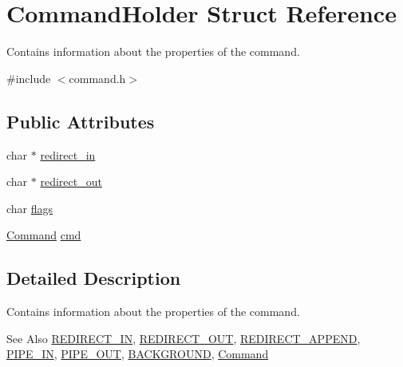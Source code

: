 \hypertarget{structCommandHolder}{\section{Command\-Holder Struct Reference}
\label{structCommandHolder}
}


Contains information about the properties of the command.  




{\ttfamily \#include $<$command.\-h$>$}

\subsection*{Public Attributes}
\begin{DoxyCompactItemize}
\item 
char $\ast$ \hyperlink{structCommandHolder_a3691bd22096644e8c6be327fc7d0d246}{redirect\-\_\-in}
\item 
char $\ast$ \hyperlink{structCommandHolder_ac7bfc3e78a8e8b511e2b324c45a17d6f}{redirect\-\_\-out}
\item 
char \hyperlink{structCommandHolder_acb381d6ab29bc574dc1ff452adc7847a}{flags}
\item 
\hyperlink{unionCommand}{Command} \hyperlink{structCommandHolder_a83a7e82024a6f736ffebed0792aa12a9}{cmd}
\end{DoxyCompactItemize}


\subsection{Detailed Description}
Contains information about the properties of the command. 

\begin{DoxySeeAlso}{See Also}
\hyperlink{command_8h_ab6714acca9cb634f10b7f5a23c349e3e}{R\-E\-D\-I\-R\-E\-C\-T\-\_\-\-I\-N}, \hyperlink{command_8h_af178f598332c2233dfbdc334a05a2a66}{R\-E\-D\-I\-R\-E\-C\-T\-\_\-\-O\-U\-T}, \hyperlink{command_8h_a6b682fe2ba1a0c489d50822c3feecdac}{R\-E\-D\-I\-R\-E\-C\-T\-\_\-\-A\-P\-P\-E\-N\-D}, \hyperlink{command_8h_a3fc15bc38c2cd3ce6f7dd40f4c0115dd}{P\-I\-P\-E\-\_\-\-I\-N}, \hyperlink{command_8h_af2aa1b20c10d6507c47f11588e21c324}{P\-I\-P\-E\-\_\-\-O\-U\-T}, \hyperlink{command_8h_a850b2f07a67b73890889e63fb8a49fda}{B\-A\-C\-K\-G\-R\-O\-U\-N\-D}, \hyperlink{unionCommand}{Command} 
\end{DoxySeeAlso}


